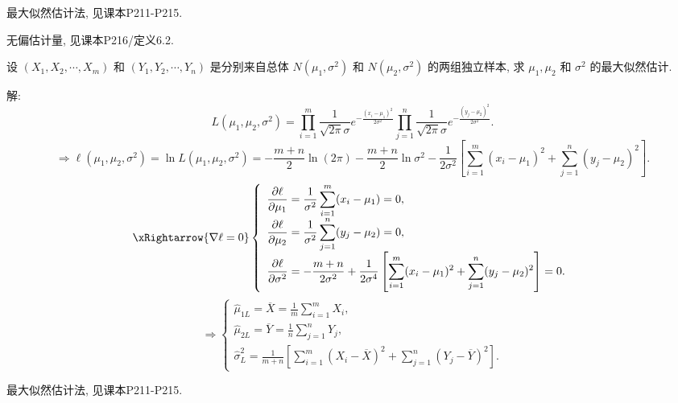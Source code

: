 \documentclass[standard]{ExBook}
\renewenvironment{shaded}{%
  \def\FrameCommand{\fboxsep=\FrameSep \colorbox{shadecolor}}%
  \MakeFramed{\advance\hsize-\width \FrameRestore}%
}{%
  \endMakeFramed
}
\begin{document}
\begin{qitems}
\textcolor{themeColor}{\selectfont {} 最大似然估计法, 见课本P211-P215.}

\textcolor{themeColor}{\selectfont {} 无偏估计量, 见课本P216/定义6.2.}

\vspace{2.5cm-5em}

    \begin{bbox}
    \begin{shaded}
        \qitem
设 \((X_1, X_2, \cdots, X_m)\) 和 \((Y_1, Y_2, \cdots, Y_n)\) 是分别来自总体 \(N(\mu_1, \sigma^2)\) 和 \(N(\mu_2, \sigma^2)\) 的两组独立样本, 求 \(\mu_1, \mu_2\) 和 \(\sigma^2\) 的最大似然估计.
    \end{shaded}
    \end{bbox}

\vspace{\dimexpr2.5cm-5em\relax}

解: 
$$
L(\mu_1,\mu_2,\sigma^2)
=
\prod_{i=1}^{m}\frac{1}{\sqrt{2\pi}\sigma}
e^{-\frac{(x_i-\mu_1)^2}{2\sigma^2}}
\prod_{j=1}^{n}\frac{1}{\sqrt{2\pi}\sigma}
e^{-\frac{(y_j-\mu_2)^2}{2\sigma^2}}.
$$
$$
\Longrightarrow
\ell(\mu_1,\mu_2,\sigma^2)
=\ln L(\mu_1,\mu_2,\sigma^2)
=-\frac{m+n}{2}\ln(2\pi)
-\frac{m+n}{2}\ln\sigma^2
-\frac{1}{2\sigma^2}
\left[
\sum_{i=1}^{m}(x_i-\mu_1)^2
+
\sum_{j=1}^{n}(y_j-\mu_2)^2
\right].
$$
$$
\xRightarrow{\nabla\ell=0}
\left\{
\begin{array}{l}
\displaystyle
\frac{\partial\ell}{\partial\mu_1}
=\frac{1}{\sigma^2}\sum\limits_{i=1}^{m}(x_i-\mu_1)=0,\\
\displaystyle
\frac{\partial\ell}{\partial\mu_2}
=\frac{1}{\sigma^2}\sum\limits_{j=1}^{n}(y_j-\mu_2)=0,\\
\displaystyle
\frac{\partial\ell}{\partial\sigma^2}
=-\frac{m+n}{2\sigma^2}
+\frac{1}{2\sigma^4}
\left[
\sum\limits_{i=1}^{m}(x_i-\mu_1)^2
+
\sum\limits_{j=1}^{n}(y_j-\mu_2)^2
\right]=0.
\end{array}
\right.
$$
$$
\Longrightarrow
\left\{
\begin{array}{l}
\displaystyle
\hat{\mu}_{1L}=\overline{X}
=\frac{1}{m}\sum\limits_{i=1}^{m}X_i,\\[0.9em]
\displaystyle
\hat{\mu}_{2L}=\overline{Y}
=\frac{1}{n}\sum\limits_{j=1}^{n}Y_j,\\[0.9em]
\displaystyle
\hat{\sigma}_{L}^{2}
=
\frac{1}{m+n}
\left[
\sum\limits_{i=1}^{m}(X_i-\overline{X})^2
+
\sum\limits_{j=1}^{n}(Y_j-\overline{Y})^2
\right].
\end{array}
\right.
$$

\textcolor{themeColor}{\selectfont {} 最大似然估计法, 见课本P211-P215.}


\end{qitems}
\end{document}
